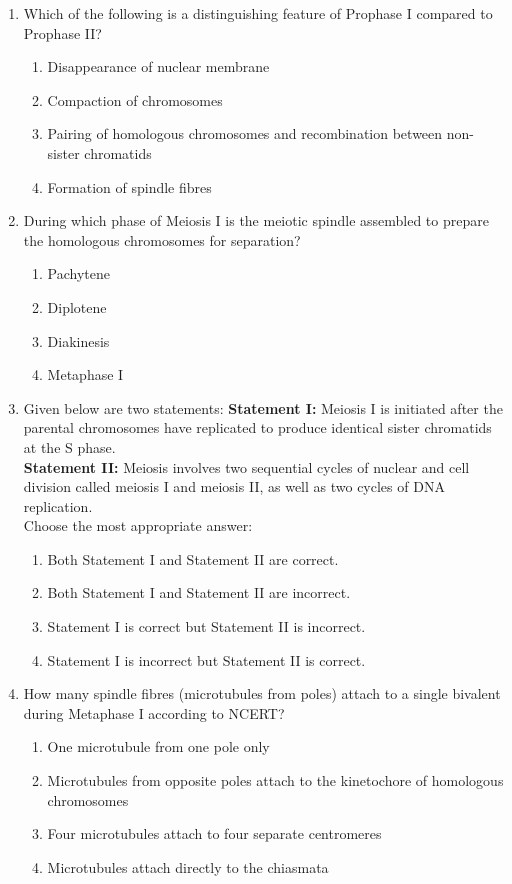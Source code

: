 \documentclass[11pt,a4paper]{article}
\begin{document}
\begin{enumerate}[label=\textbf{\arabic*.}]
\item Which of the following is a distinguishing feature of Prophase I compared to Prophase II?
\begin{enumerate}[label=(\Alph*)]
    \item Disappearance of nuclear membrane
    \item Compaction of chromosomes
    \item Pairing of homologous chromosomes and recombination between non-sister chromatids
    \item Formation of spindle fibres
\end{enumerate}

\item During which phase of Meiosis I is the meiotic spindle assembled to prepare the homologous chromosomes for separation?
\begin{enumerate}[label=(\Alph*)]
    \item Pachytene
    \item Diplotene
    \item Diakinesis
    \item Metaphase I
\end{enumerate}

\item Given below are two statements:
\textbf{Statement I:} Meiosis I is initiated after the parental chromosomes have replicated to produce identical sister chromatids at the S phase.\\
\textbf{Statement II:} Meiosis involves two sequential cycles of nuclear and cell division called meiosis I and meiosis II, as well as two cycles of DNA replication.\\
Choose the most appropriate answer:
\begin{enumerate}[label=(\Alph*)]
    \item Both Statement I and Statement II are correct.
    \item Both Statement I and Statement II are incorrect.
    \item Statement I is correct but Statement II is incorrect.
    \item Statement I is incorrect but Statement II is correct.
\end{enumerate}

\item How many spindle fibres (microtubules from poles) attach to a single bivalent during Metaphase I according to NCERT?
\begin{enumerate}[label=(\Alph*)]
    \item One microtubule from one pole only
    \item Microtubules from opposite poles attach to the kinetochore of homologous chromosomes
    \item Four microtubules attach to four separate centromeres
    \item Microtubules attach directly to the chiasmata
\end{enumerate}


\end{enumerate}
\end{document}
